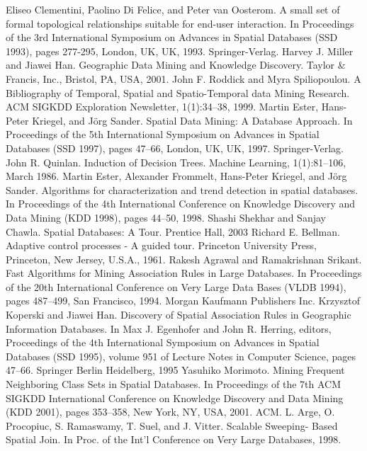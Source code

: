 \documentclass[12pt]{article}
\begin{document}
\begin{thebibliography}{}
 Eliseo Clementini, Paolino Di Felice, and Peter van Oosterom. A small set of formal topological relationships suitable for end-user interaction. In Proceedings of the 3rd International Symposium on Advances in Spatial Databases (SSD 1993), pages 277-295, London, UK, UK, 1993. Springer-Verlag.
 Harvey J. Miller and Jiawei Han. Geographic Data Mining and Knowledge Discovery. Taylor \& Francis, Inc., Bristol, PA, USA, 2001.
John F. Roddick and Myra Spiliopoulou. A Bibliography of Temporal, Spatial and Spatio-Temporal data Mining Research. ACM SIGKDD Exploration Newsletter, 1(1):34–38, 1999.
Martin Ester, Hans-Peter Kriegel, and Jörg Sander. Spatial Data Mining: A Database Approach. In Proceedings of the 5th International Symposium on Advances in Spatial Databases (SSD 1997), pages 47–66, London, UK, UK, 1997. Springer-Verlag.
 John R. Quinlan. Induction of Decision Trees. Machine Learning, 1(1):81–106, March 1986.
Martin Ester, Alexander Frommelt, Hans-Peter Kriegel, and Jörg Sander. Algorithms for characterization and trend detection in spatial databases. In Proceedings of the 4th International Conference on Knowledge Discovery and Data Mining (KDD 1998), pages 44–50, 1998.
Shashi Shekhar and Sanjay Chawla. Spatial Databases: A Tour. Prentice Hall, 2003
 Richard E. Bellman. Adaptive control processes - A guided tour. Princeton University Press, Princeton, New Jersey, U.S.A., 1961.
 Rakesh Agrawal and Ramakrishnan Srikant. Fast Algorithms for Mining Association Rules in Large Databases. In Proceedings of the 20th International Conference on Very Large Data Bases (VLDB 1994), pages 487–499, San Francisco, 1994. Morgan Kaufmann Publishers Inc.
 Krzysztof Koperski and Jiawei Han. Discovery of Spatial Association Rules in Geographic Information Databases. In Max J. Egenhofer and John R. Herring, editors, Proceedings of the 4th International Symposium on Advances in Spatial Databases (SSD 1995), volume 951 of Lecture Notes in Computer Science, pages 47–66. Springer Berlin Heidelberg, 1995
Yasuhiko Morimoto. Mining Frequent Neighboring Class Sets in Spatial Databases. In Proceedings of the 7th ACM SIGKDD International Conference on Knowledge Discovery and Data Mining (KDD 2001), pages 353–358, New York, NY, USA, 2001. ACM.
L. Arge, O. Procopiuc, S. Ramaswamy, T. Suel, and J. Vitter. Scalable Sweeping-
Based Spatial Join. In Proc. of the Int’l Conference on Very Large Databases, 1998.

\end{thebibliography}
\end{document}
